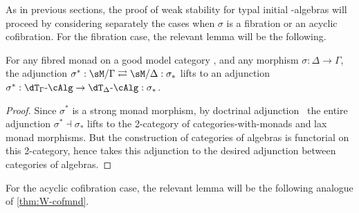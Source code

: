 \documentclass[referee]{psp}
\def\alg{\text{-}\cAlg}
\begin{document}
As in previous sections, the proof of weak stability for typal initial \dT-algebras will proceed by considering separately the cases when $\sigma$ is a fibration or an acyclic cofibration.
For the fibration case, the relevant lemma will be the following.

\begin{lem}\label{thm:fibmnd-radj}
  For any fibred monad \dT on a good model category \sM, and any morphism $\sigma:\Delta\to\Gamma$, the adjunction $\sigma^*: \sM/\Gamma \toot \sM/\Delta : \sigma_*$ lifts to an adjunction $\sigma^*:\dT_\Gamma\alg \to \dT_\Delta\alg: \sigma_*$.
\end{lem}
\begin{proof}
  Since $\sigma^*$ is a strong monad morphism, by doctrinal adjunction~\cite{kelly:doc-adjn} the entire adjunction $\sigma^*\dashv\sigma_*$ lifts to the 2-category of categories-with-monads and lax monad morphisms.
  But the construction of categories of algebras is functorial on this 2-category, hence takes this adjunction to the desired adjunction between categories of algebras.
\end{proof}

For the acyclic cofibration case, the relevant lemma will be the following analogue of \cref{thm:W-cofmnd}.
\end{document}

